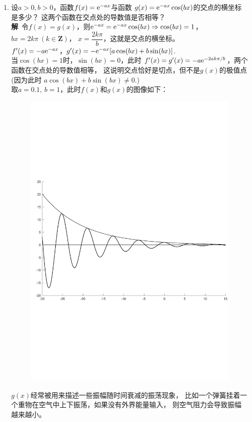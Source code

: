 \begin{enumerate}[label={【\textbf{例\thechapter.\arabic*}】},
 leftmargin=\inteval{\myenumleftmargin}pt,
 itemsep=\inteval{\myenumitempsep}pt,
 itemindent=\inteval{\myenumitemindent}pt]
\item 设$ a>0,b>0 $，函数$ f(x)=\mathrm{e}^{-ax} $与函数
$ g(x)=\mathrm{e}^{-ax}\cos(bx) $的交点的横坐标是多少？
这两个函数在交点处的导数值是否相等？\\
\textbf{解}\ 令$ f(x)=g(x) $，则$ \mathrm{e}^{-ax}=\mathrm{e}^{-ax}\cos(bx)
\Rightarrow \cos(bx)=1 $，$ bx=2k\pi\ (k\in\textbf{Z}) $，
$ x=\dfrac{2k\pi}{b} $，这就是交点的横坐标。 \\
$ f'(x)=-a\mathrm{e}^{-ax} $，$ g'(x)=-\mathrm{e}^{-ax}[a\cos(bx)+b\sin(bx)] $. \\ 
当$ \cos(bx)=1 $时，$ \sin(bx)=0 $，此时
$ f'(x)=g'(x)=-a\mathrm{e}^{-2ak\pi/b} $，两个函数在交点处的导数值相等，
这说明交点恰好是切点，但不是$ g(x) $的极值点(因为此时
$ a\cos(bx)+b\sin(bx)\neq 0 $.) \\
取$ a=0.1,\ b=1 $，此时$ f(x) $和$ g(x) $的图像如下：
\begin{figure}[H] %
    \centering
    \includegraphics[width=0.8\linewidth]{PDF_Picture/有阻尼自由振荡函数图像}
\end{figure}
$ g(x) $经常被用来描述一些振幅随时间衰减的振荡现象，
比如一个弹簧挂着一个重物在空气中上下振荡，如果没有外界能量输入，
则空气阻力会导致振幅越来越小。


\end{enumerate}
